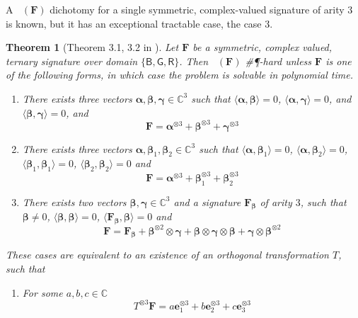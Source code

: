 \documentclass[11pt]{article}
\newtheorem{theorem}{Theorem}[section]
\DeclareMathOperator{\holts}{Holant^*_3}
\newcommand{\db}{\mathsf{B}}
\newcommand{\dg}{\mathsf{G}}
\newcommand{\dr}{\mathsf{R}}
\newcommand{\sph}{\#\P-hard\xspace}
\newcommand{\teh}{^{\otimes 3}}
\begin{document}
A $\holts(\mathbf{F})$ dichotomy for a single symmetric, complex-valued signature of arity $3$ is known, but it has an exceptional tractable case, the case 3.
\begin{theorem}[Theorem 3.1, 3.2 in \cite{cai_dichotomy_2013}]
Let $\mathbf{F}$ be a symmetric, complex valued, ternary signature over domain $\{\db, \dg, \dr\}$.
Then $\holts(\mathbf{F})$ \sph unless $\mathbf{F}$ is one of the following forms, in which case the problem is solvable in polynomial time.
\begin{enumerate}
  \item There exists three vectors $\boldsymbol{\alpha}, \boldsymbol{\beta}, \boldsymbol{\gamma} \in \mathbb{C}^3$ such that $\langle \boldsymbol{\alpha}, \boldsymbol{\beta} \rangle = 0$, $\langle \boldsymbol{\alpha}, \boldsymbol{\gamma} \rangle = 0$, and $\langle \boldsymbol{\beta}, \boldsymbol{\gamma} \rangle = 0$, and 
    \[
      \mathbf{F} = \boldsymbol{\alpha}\teh + \boldsymbol{\beta}\teh + \boldsymbol{\gamma}\teh
    \]
  \item There exists three vectors $\boldsymbol{\alpha}, \boldsymbol{\beta}_1, \boldsymbol{\beta}_2 \in \mathbb{C}^3$ such that 
    $\langle \boldsymbol{\alpha}, \boldsymbol{\beta}_1 \rangle = 0$, $\langle \boldsymbol{\alpha}, \boldsymbol{\beta}_2 \rangle = 0$, 
    $\langle \boldsymbol{\beta}_1, \boldsymbol{\beta}_1 \rangle = 0$,
    $\langle \boldsymbol{\beta}_2, \boldsymbol{\beta}_2 \rangle = 0$ and 
    \[
      \mathbf{F} = \boldsymbol{\alpha}\teh + \boldsymbol{\beta}_1\teh + \boldsymbol{\beta}_2\teh
    \]
  \item There exists two vectors $\boldsymbol{\beta}, \boldsymbol{\gamma} \in \mathbb{C}^3$ and a signature $\mathbf{F}_{\boldsymbol{\beta}}$ of arity $3$, such that
    $\boldsymbol{\beta} \ne 0$, $\langle \boldsymbol{\beta}, \boldsymbol{\beta} \rangle = 0$, $\langle \mathbf{F}_{\boldsymbol{\beta}}, \boldsymbol{\beta} \rangle = 0$ and
    \[
      \mathbf{F} = \mathbf{F}_{\boldsymbol{\beta}} + \boldsymbol{\beta}^{\otimes 2} \otimes \boldsymbol{\gamma} + \boldsymbol{\beta} \otimes \boldsymbol{\gamma} \otimes \boldsymbol{\beta} + \boldsymbol{\gamma} \otimes \boldsymbol{\beta}^{\otimes 2}
    \]
\end{enumerate}
These cases are equivalent to an existence of an orthogonal transformation $T$, such that 
\begin{enumerate}
  \item 
    For some $a, b, c \in \mathbb{C}$
    \[
      T\teh \mathbf{F} = a \mathbf{e}_1\teh + b \mathbf{e}_2\teh + c \mathbf{e}_3\teh 
\]
\end{enumerate}
\end{theorem}
\end{document}
